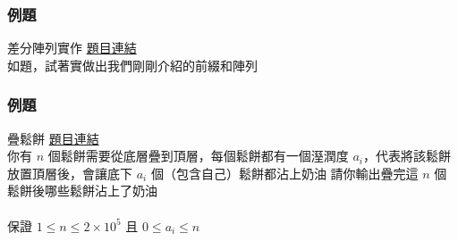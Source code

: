 \documentclass[mathserif]{beamer}
\begin{document}
\begin{frame}
    \frametitle{例題}
    \begin{block}{差分陣列實作}
        \href{https://zerojudge.tw/ShowProblem?problemid=e340}{題目連結}\\
        如題，試著實做出我們剛剛介紹的前綴和陣列
    \end{block}
\end{frame}

\begin{frame}
    \frametitle{例題}
    \begin{block}{疊鬆餅}
        \href{https://codeforces.com/problemset/problem/1501/B}{題目連結}\\
        你有 $n$ 個鬆餅需要從底層疊到頂層，每個鬆餅都有一個溼潤度 $a_i$，代表將該鬆餅放置頂層後，會讓底下 $a_i$ 個（包含自己）鬆餅都沾上奶油
        請你輸出疊完這 $n$ 個鬆餅後哪些鬆餅沾上了奶油\\
        　\\
        保證 $1 \leq n \leq 2 \times 10^5$ 且 $0 \leq a_i \leq n$
    \end{block}
\end{frame}
\end{document}
